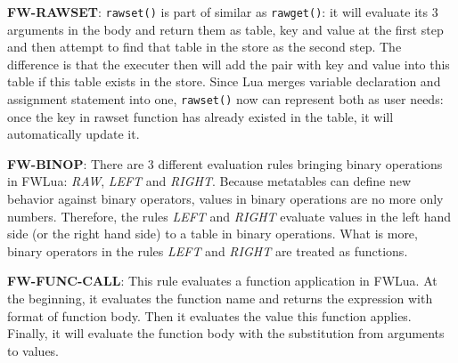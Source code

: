 {\bf FW-RAWSET}: {\tt rawset()} is part of similar as {\tt rawget()}: it will evaluate its 3 arguments in the body and return them as table, key and value at the first step and then attempt to find that table in the store as the second step. The difference is that the executer then will add the pair with key and value into this table if this table exists in the store. Since Lua merges variable declaration and assignment statement into one, {\tt rawset()} now can represent both as user needs: once the key in rawset function has already existed in the table, it will automatically update it.

{\bf FW-BINOP}: There are 3 different evaluation rules bringing binary operations in FWLua: {\it RAW}, {\it LEFT} and {\it RIGHT}. Because metatables can define new behavior against binary operators, values in binary operations are no more only numbers. Therefore, the rules {\it LEFT} and {\it RIGHT} evaluate values in the left hand side (or the right hand side) to a table in binary operations. What is more, binary operators in the rules {\it LEFT} and {\it RIGHT} are treated as functions.

{\bf FW-FUNC-CALL}: This rule evaluates a function application in FWLua. At the beginning, it evaluates the function name and returns the expression with format of function body. Then it evaluates the value this function applies. Finally, it will evaluate the function body with the substitution from arguments to values. 


